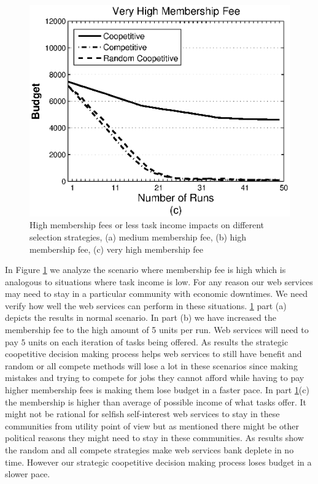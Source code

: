 \documentclass[runningheads,a4paper]{llncs}
\begin{document}
\begin{figure}
\includegraphics[scale=0.302]{graphbgtveryhigh.eps}
\caption{High membership fees or less task income impacts on different selection strategies, (a) medium membership fee, (b) high membership fee, (c) very high membership fee} \label{membership_fee_graph}
\end{figure}

In Figure \ref{membership_fee_graph} we analyze the scenario where membership fee is high which is analogous to situations where task income is low. For any reason our web services may need to stay in a particular community with economic downtimes. We need verify how well the web services can perform in these situations. \ref{membership_fee_graph} part (a) depicts the results in normal scenario. In part (b) we have increased the membership fee to the high amount of 5 units per run. Web services will need to pay $5$ units on each iteration of tasks being offered. As results the strategic coopetitive decision making process helps web services to still have benefit and random or all compete methods will lose a lot in these scenarios since making mistakes and trying to compete for jobs they cannot afford while having to pay higher membership fees is making them lose budget in a faster pace. In part \ref{membership_fee_graph}(c) the membership is higher than average of possible income of what tasks offer. It might not be rational for selfish self-interest web services to stay in these communities from utility point of view but as mentioned there might be other political reasons they might need to stay in these communities. As results show the random and all compete strategies make web services bank deplete in no time. However our strategic coopetitive decision making process loses budget in a slower pace.
\end{document}
